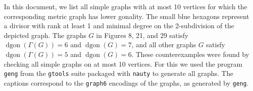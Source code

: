 \documentclass{article}
\DeclareMathOperator{\dgon}{dgon}
\begin{document}
\textrm{In this document, we list all simple graphs with at most 10 vertices for which the corresponding metric graph has lower gonality. The small blue hexagons represent a divisor with rank at least 1 and minimal degree on the 2-subdivision of the depicted graph. The graphs $G$ in Figures 8, 21, and 29 satisfy $\dgon(\Gamma(G)) = 6$ and $\dgon(G) = 7$, and all other graphs $G$ satisfy $\dgon(\Gamma(G)) = 5$ and $\dgon(G) = 6$. These counterexamples were found by checking all simple graphs on at most 10 vertices. For this we used the program \texttt{geng} from the \texttt{gtools} suite packaged with \texttt{nauty} to generate all graphs. The captions correspond to the \texttt{graph6} encodings of the graphs, as generated by \texttt{geng}.  \newline\newline }
\end{document}
